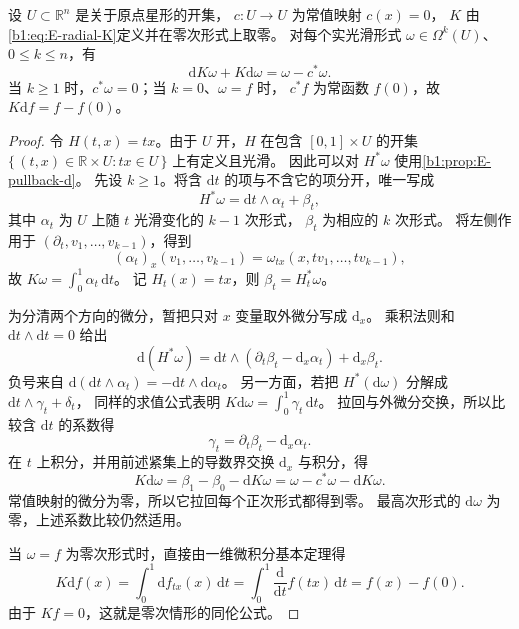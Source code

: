 \begin{proposition}[径向同伦公式]\label{b1:prop:E-radial-homotopy}
设 \(U\subset\mathbb R^n\) 是关于原点星形的开集，
\(c:U\rightarrow U\) 为常值映射 \(c(x)=0\)，
\(K\) 由\eqref{b1:eq:E-radial-K}定义并在零次形式上取零。
对每个实光滑形式 \(\omega\in\Omega^k(U)\)、\(0\leq k\leq n\)，有
\begin{equation}\label{b1:eq:E-homotopy-identity}
 \mathrm dK\omega+K\mathrm d\omega=\omega-c^*\omega.
\end{equation}
当 \(k\geq1\) 时，\(c^*\omega=0\)；当 \(k=0\)、\(\omega=f\) 时，
\(c^*f\) 为常函数 \(f(0)\)，故 \(K\mathrm df=f-f(0)\)。
\end{proposition}
\begin{proof}
令 \(H(t,x)=tx\)。由于 \(U\) 开，\(H\) 在包含 \([0,1]\times U\) 的开集
\(\{\,(t,x)\in\mathbb R\times U:tx\in U\,\}\) 上有定义且光滑。
因此可以对 \(H^*\omega\) 使用\cref{b1:prop:E-pullback-d}。
先设 \(k\geq1\)。将含 \(\mathrm dt\) 的项与不含它的项分开，唯一写成
\[
 H^*\omega=\mathrm dt\wedge\alpha_t+\beta_t,
\]
其中 \(\alpha_t\) 为 \(U\) 上随 \(t\) 光滑变化的 \(k-1\) 次形式，
\(\beta_t\) 为相应的 \(k\) 次形式。
将左侧作用于 \((\partial_t,v_1,\ldots,v_{k-1})\)，得到
\[
 (\alpha_t)_x(v_1,\ldots,v_{k-1})
 =\omega_{tx}(x,tv_1,\ldots,tv_{k-1}),
\]
故 \(K\omega=\int_0^1\alpha_t\,\mathrm dt\)。
记 \(H_t(x)=tx\)，则 \(\beta_t=H_t^*\omega\)。

为分清两个方向的微分，暂把只对 \(x\) 变量取外微分写成 \(\mathrm d_x\)。
乘积法则和 \(\mathrm dt\wedge\mathrm dt=0\) 给出
\[
 \mathrm d(H^*\omega)
 =\mathrm dt\wedge(\partial_t\beta_t-\mathrm d_x\alpha_t)
   +\mathrm d_x\beta_t.
\]
负号来自 \(\mathrm d(\mathrm dt\wedge\alpha_t)
=-\mathrm dt\wedge\mathrm d\alpha_t\)。
另一方面，若把 \(H^*(\mathrm d\omega)\) 分解成
\(\mathrm dt\wedge\gamma_t+\delta_t\)，
同样的求值公式表明 \(K\mathrm d\omega=\int_0^1\gamma_t\,\mathrm dt\)。
拉回与外微分交换，所以比较含 \(\mathrm dt\) 的系数得
\[
 \gamma_t=\partial_t\beta_t-\mathrm d_x\alpha_t.
\]
在 \(t\) 上积分，并用前述紧集上的导数界交换 \(\mathrm d_x\) 与积分，得
\[
 K\mathrm d\omega=\beta_1-\beta_0-\mathrm dK\omega
                 =\omega-c^*\omega-\mathrm dK\omega.
\]
常值映射的微分为零，所以它拉回每个正次形式都得到零。
最高次形式的 \(\mathrm d\omega\) 为零，上述系数比较仍然适用。

当 \(\omega=f\) 为零次形式时，直接由一维微积分基本定理得
\[
 K\mathrm df(x)
 =\int_0^1\mathrm df_{tx}(x)\,\mathrm dt
 =\int_0^1\frac{\mathrm d}{\mathrm dt}f(tx)\,\mathrm dt
 =f(x)-f(0).
\]
由于 \(Kf=0\)，这就是零次情形的同伦公式。
\end{proof}

